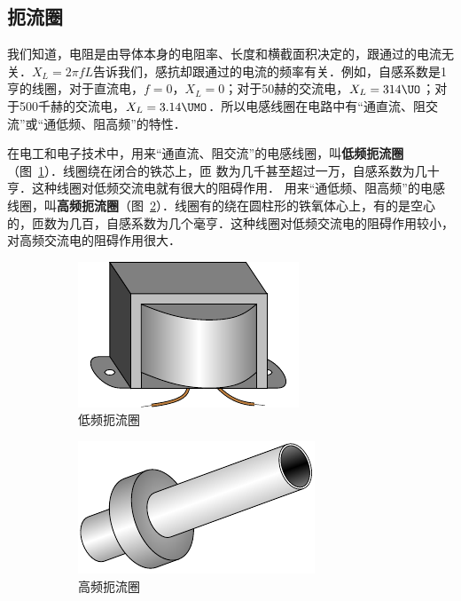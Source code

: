 \subsection{扼流圈}

我们知道，电阻是由导体本身的电阻率、长度和横截面积决定的，跟通过的电流无关．$X_L=2\pi fL$告诉我们，感抗却跟通过的电流的频率有关．例如，自感系数是1亨的线圈，对于直流电，$f=0$，$X_L=0$；对于50赫的交流电，$X_L=314 \UO$；对于500千赫的交流电，$X_L=3.14 \UMO $．所以电感线圈在电路中有“通直流、阻交流”或“通低频、阻高频”的特性．

在电工和电子技术中，用来“通直流、阻交流”的电感线圈，叫\textbf{低频扼流圈}（图~\ref{fig_C_3-16a}）．线圈绕在闭合的铁芯上，匝
数为几千甚至超过一万，自感系数为几十亨．这种线圈对低频交流电就有很大的阻碍作用．
用来“通低频、阻高频”的电感线圈，叫\textbf{高频扼流圈}（图~\ref{fig_C_3-16b}）．线圈有的绕在圆柱形的铁氧体心上，有的是空心的，匝数为几百，自感系数为几个毫亨．这种线圈对低频交流电的阻碍作用较小，对高频交流电的阻碍作用很大．
\begin{figure}[htbp]
    \centering
    \begin{subfigure}{0.4\linewidth}
        \centering
        \includegraphics{fig/C/3-16a.pdf}
        \caption{低频扼流圈}\label{fig_C_3-16a}
    \end{subfigure}
    \hfil
    \begin{subfigure}{0.4\linewidth}
        \centering
        \includegraphics{fig/C/3-16b.pdf}
        \caption{高频扼流圈}\label{fig_C_3-16b}
    \end{subfigure}
    \caption{}\label{fig_C_3-16}
\end{figure}

